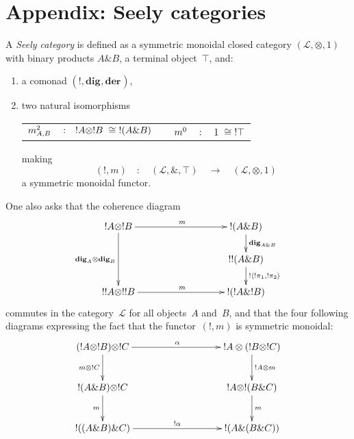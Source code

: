 \documentclass[runningheads,a4paper]{llncs}
\newcommand{\with}{\&}
\newcommand{\tensor}{\otimes}
\newcommand{\lax}{m}
\newcommand{\laxzero}{m^0}
\newcommand{\laxdeux}[2]{m^2_{#1 , #2}}
\newcommand{\LAT}{\mathscr{L}}
\newcommand{\dig}[1]{\mathbf{dig}_{#1}}
\newcommand{\der}[1]{\mathbf{der}_{#1}}
\newcommand{\morph}[1]{\stackrel{#1}{\longrightarrow}}
\newcommand{\one}{1}
\newcommand{\paire}[2]{\langle #1,#2\rangle}
\begin{document}
\section*{Appendix: Seely categories}
A \emph{Seely category} is defined as a symmetric monoidal closed category
$(\LAT,\tensor,1)$ with binary products $A\with B$, a terminal object~$\top$, and:
\begin{enumerate}\item a comonad $(!,\dig{},\der{})$,
\item two natural isomorphisms 
\begin{center}
\begin{tabular}{ccc}
$\laxdeux{A}{B}
\hspace{1em}
:
\hspace{1em}
!A\tensor !B
\hspace{.3em}
\cong 
\hspace{.3em}
!(A\with B)$
&
\hspace{4em}
&
$\laxzero
\hspace{1em}
:
\hspace{1em}
1
\hspace{.3em}
\cong 
\hspace{.3em}
!\top$
\end{tabular}
\end{center}
making
$$(!,\lax) \quad : \quad (\LAT,\with,\top) \quad \morph{} \quad (\LAT,\tensor,\one)$$
a symmetric monoidal functor.
\end{enumerate}
One also asks that the coherence diagram
\begin{equation}
\label{equation/diagram-of-seely-one}
\vcenter{\xymatrix @-.5pc {
!A\tensor !B
\ar[rrrr]^{\lax}
\ar[dd]_{\dig{A}\tensor \dig{B}}
&&&&
!(A\with B)
\ar[d]^{\dig{A\with B}}
\\
&&&&
!!(A\with B)
\ar[d]^{!\paire{!\pi_1}{!\pi_2}}
\\
!!A\tensor !!B
\ar[rrrr]^{\lax}
&&&&
!(!A\with !B)}}
\end{equation}
commutes in the category~$\LAT$ for all objects~$A$ and~$B$, and that the four following diagrams expressing the fact that the functor~$(!,\lax)$
is symmetric monoidal:
\begin{equation}\label{equation/diagram-of-seely-two}
\vcenter{\xymatrix @+.2pc {
(!A\tensor !B)\tensor !C
\ar[rrr]^{\alpha}
\ar[d]_{\lax\tensor !C}
&&&
!A\tensor(!B\tensor !C)
\ar[d]^{!A\tensor \lax}
\\
!(A\with B)\tensor !C\ar[d]_{\lax}
&&&
!A\tensor !(B\with C)\ar[d]^{\lax}
\\
!((A\with B)\with C)\ar[rrr]^{!\alpha}
&&&
!(A\with (B\with C))}}
\end{equation}
\end{document}
